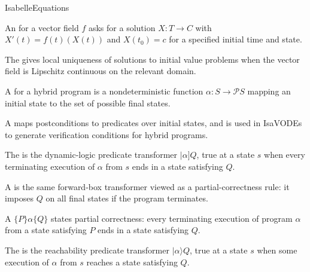 \documentclass[hidelinks]{article}
\begin{document}
\begin{smodule}[title={IsaVODEs: Interactive Verification of Cyber-Physical Systems at Scale}]{IsabelleEquations}
\begin{sdefinition}[for=InitialValueProblem]
    An  for a vector field \(f\) asks for a solution \(X:T\to C\) with \(X'(t)=f(t)(X(t))\) and \(X(t_0)=c\) for a specified initial time and state.
\end{sdefinition}

\begin{sdefinition}[for=PicardLindelofTheorem]
    The  gives local uniqueness of solutions to initial value problems when the vector field is Lipschitz continuous on the relevant domain.
\end{sdefinition}

\begin{sdefinition}[for=StateTransformer]
    A  for a hybrid program is a nondeterministic function \(\alpha:S\to\mathcal{P}S\) mapping an initial state to the set of possible final states.
\end{sdefinition}

\begin{sdefinition}[for=PredicateTransformer]
    A  maps postconditions to predicates over initial states, and is used in IsaVODEs to generate verification conditions for hybrid programs.
\end{sdefinition}

\begin{sdefinition}[for=ForwardBox]
    The  is the dynamic-logic predicate transformer \(|\alpha]Q\), true at a state \(s\) when every terminating execution of \(\alpha\) from \(s\) ends in a state satisfying \(Q\).
\end{sdefinition}

\begin{sdefinition}[for=WeakestLiberalPrecondition]
    A  is the same forward-box transformer viewed as a partial-correctness rule: it imposes \(Q\) on all final states if the program terminates.
\end{sdefinition}

\begin{sdefinition}[for=HoareTriple]
    A  \(\{P\}\alpha\{Q\}\) states partial correctness: every terminating execution of program \(\alpha\) from a state satisfying \(P\) ends in a state satisfying \(Q\).
\end{sdefinition}

\begin{sdefinition}[for=ForwardDiamond]
    The  is the reachability predicate transformer \(|\alpha\rangle Q\), true at a state \(s\) when some execution of \(\alpha\) from \(s\) reaches a state satisfying \(Q\).
\end{sdefinition}


\end{smodule}
\end{document}
